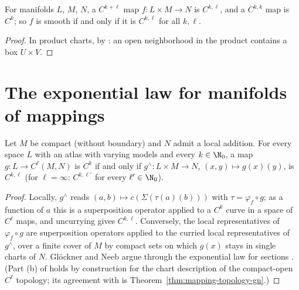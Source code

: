 \begin{proposition}
  \label{prop:ckl-product}
  \leanok
  For manifolds $L$, $M$, $N$, a $C^{k+\ell}$ map $f \colon L \times M \to N$ is $C^{k,\ell}$, and a
  $C^{k,k}$ map is $C^k$; so $f$ is smooth if and only if it is $C^{k,\ell}$ for all $k, \ell$.
\end{proposition}

\begin{proof}
  \leanok
  In product charts, by \cite[Prop.~1.7.33(a), (b)]{GN26}: an open neighborhood in the product
  contains a box $U \times V$.
\end{proof}

\section{The exponential law for manifolds of mappings}

\begin{theorem}
  \label{thm:mapping-exp-law}
  \leanok
  Let $M$ be compact (without boundary) and $N$ admit a local addition. For every space $L$ with
  an atlas with varying models and every $k \in \N_0$, a map $g \colon L \to C^\ell(M, N)$ is
  $C^k$ if and only if $g^\wedge \colon L \times M \to N$, $(x, y) \mapsto g(x)(y)$, is
  $C^{k,\ell}$ (for $\ell = \infty$: $C^{k,\ell'}$ for every $\ell' \in \N_0$).
\end{theorem}

\begin{proof}
  \leanok
  Locally, $g^\wedge$ reads $(a, b) \mapsto c(\Sigma(\tau(a)(b)))$ with $\tau = \varphi_f \circ g$;
  as a function of $a$ this is a superposition operator applied to a $C^k$ curve in a space of
  $C^\ell$ maps, and uncurrying gives $C^{k,\ell}$. Conversely, the local representatives of
  $\varphi_f \circ g$ are superposition operators applied to the curried local representatives
  of $g^\wedge$, over a finite cover of $M$ by compact sets on which $g(x)$ stays in single charts
  of $N$. Glöckner and Neeb argue through the exponential law for sections
  \cite[Prop.~4.1.34]{GN26}. (Part (b) of \cite[Thm.~4.2.2]{GN26} holds by construction for the
  chart description of the compact-open $C^\ell$ topology; its agreement with
  \cite[Def.~4.1.2]{GN26} is Theorem~\ref{thm:mapping-topology-gn}.)
\end{proof}

